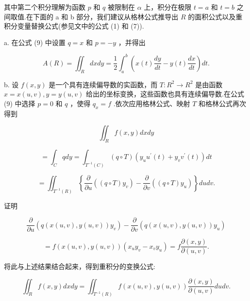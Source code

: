 其中第二个积分理解为函数 \(p\) 和 \(q\) 被限制在 \(\alpha\) 上，积分在极限 \(t = a\) 和 \(t = b\) 之间取值.在下面的 a 和 b 部分，我们建议从格林公式推导出 \(R\) 的面积公式以及重积分变量替换公式(参见文中的公式 (1) 和 (7)).

a. 在公式 (9) 中设置 \(q = x\) 和 \(p =  - y\) ，并得出

\[
A\left( R\right)  = {\iint }_{R}{dxdy} = \frac{1}{2}{\int }_{a}^{b}\left( {x\left( t\right) \frac{dy}{dt} - y\left( t\right) \frac{dx}{dt}}\right) {dt}.
\]

b. 设 \(f\left( {x,y}\right)\) 是一个具有连续偏导数的实函数，而 \(T : {R}^{2} \rightarrow  {R}^{2}\) 是由函数 \(x = x\left( {u,v}\right) ,y = y\left( {u,v}\right)\) 给出的坐标变换，这些函数也具有连续偏导数.在公式 (9) 中选择 \(p = 0\) 和 \(q\) ，使得 \({q}_{x} = f\) .依次应用格林公式、映射 \(T\) 和格林公式再次得到

\[
{\iint }_{R}f\left( {x,y}\right) {dxdy}
\]

\[
= {\int }_{C}{qdy} = {\int }_{{T}^{-1}\left( C\right) }\left( {q \circ  T}\right) \left( {{y}_{u}{u}^{\prime }\left( t\right)  + {y}_{v}{v}^{\prime }\left( t\right) }\right) {dt}
\]

\[
= {\iint }_{{T}^{-1}\left( R\right) }\left\{  {\frac{\partial }{\partial u}\left( {\left( {q \circ  T}\right) {y}_{v}}\right)  - \frac{\partial }{\partial v}\left( {\left( {q \circ  T}\right) {y}_{u}}\right) }\right\}  {dudv}.
\]

证明

\[
\frac{\partial }{\partial u}\left( {q\left( {x\left( {u,v}\right) ,y\left( {u,v}\right) }\right) {y}_{v}}\right)  - \frac{\partial }{\partial v}\left( {q\left( {x\left( {u,v}\right) ,y\left( {u,v}\right) }\right) {y}_{u}}\right)
\]

\[
= f\left( {x\left( {u,v}\right) ,y\left( {u,v}\right) }\right) \left( {{x}_{u}{y}_{v} - {x}_{v}{y}_{u}}\right)  = f\frac{\partial \left( {x,y}\right) }{\partial \left( {u,v}\right) }.
\]

将此与上述结果结合起来，得到重积分的变换公式:

\[
{\iint }_{R}f\left( {x,y}\right) {dxdy} = {\iint }_{{T}^{-1}\left( R\right) }f\left( {x\left( {u,v}\right) ,y\left( {u,v}\right) }\right) \frac{\partial \left( {x,y}\right) }{\partial \left( {u,v}\right) }{dudv}.
\]